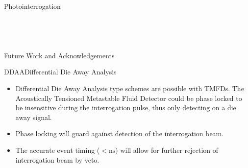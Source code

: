 \begin{col}{6}{12}
\begin{cell}{6}{8}{Photointerrogation}{}
\begin{col}{4}{8}
\begin{cell}{4}{3}{}{}
      \end{cell} \\
      \vspace*{\fill}
      \begin{cell}{4}{5}{}{}
      \end{cell}
    \end{col}%
  \end{cell}
  \vspace*{\fill} \\
  \begin{cell}{6}{4}{Future Work and Acknowledgements}{}
    \begin{cell}{3}{4}{DDAA}{Differential Die Away Analysis}
      \vspace*{\fill}
      \begin{itemize}
        \item Differential Die Away Analysis type schemes are possible with TMFDs. The Acoustically Tensioned Metastable Fluid Detector could be phase locked to be insensitive during the interrogation pulse, thus only detecting on a die away signal.
        \item Phase locking will guard against detection of the interrogation beam.
        \item The accurate event timing ($<\mathrm{ns}$) will allow for further rejection of interrogation beam by veto.
      \end{itemize}
      \vspace*{\fill}
    \end{cell}%
    \hspace*{\fill}
    \begin{cell}{3}{4}{}{}
    \end{cell}
  \end{cell}%
\end{col}

